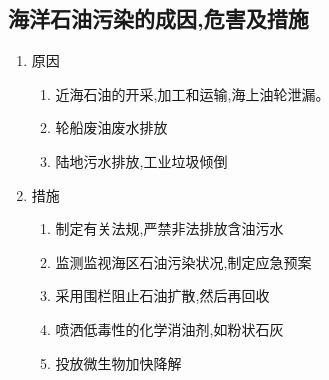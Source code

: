 \documentclass[a4paper]{article}
\begin{document}
    \subsection{海洋石油污染的成因,危害及措施}
    \begin{enumerate}
        \item 原因
        \begin{enumerate}
            \item 近海石油的开采,加工和运输,海上油轮泄漏。
            \item 轮船废油废水排放
            \item 陆地污水排放,工业垃圾倾倒
        \end{enumerate}
        \item 措施
        \begin{enumerate}
            \item 制定有关法规,严禁非法排放含油污水
            \item 监测监视海区石油污染状况,制定应急预案
            \item 采用围栏阻止石油扩散,然后再回收
            \item 喷洒低毒性的化学消油剂,如粉状石灰
            \item 投放微生物加快降解
        \end{enumerate}
    \end{enumerate}
\end{document}
